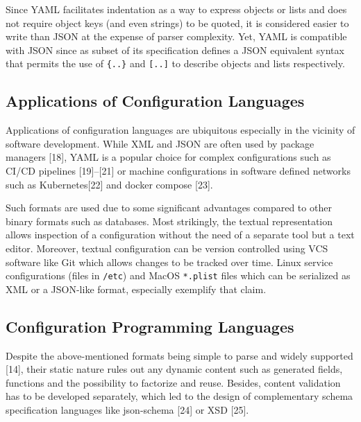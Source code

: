 \documentclass[
  a4paper,
  bibtex,
  english,
  nomenclature]{kthlatex/kththesis/kththesis}
\begin{document}
Since YAML facilitates indentation as a way to express objects or lists
and does not require object keys (and even strings) to be quoted, it is
considered easier to write than JSON at the expense of parser
complexity. Yet, YAML is compatible with JSON since as subset of its
specification defines a JSON equivalent syntax that permits the use of
\texttt{\{..\}} and \texttt{{[}..{]}} to describe objects and lists
respectively.

\hypertarget{sec:applications-of-configuration-languages}{%
\subsection{Applications of Configuration
Languages}\label{sec:applications-of-configuration-languages}}

Applications of configuration languages are ubiquitous especially in the
vicinity of software development. While XML and JSON are often used by
package managers {[}18{]}, YAML is a popular choice for complex
configurations such as CI/CD pipelines {[}19{]}--{[}21{]} or machine
configurations in software defined networks such as Kubernetes{[}22{]}
and docker compose {[}23{]}.

Such formats are used due to some significant advantages compared to
other binary formats such as databases. Most strikingly, the textual
representation allows inspection of a configuration without the need of
a separate tool but a text editor. Moreover, textual configuration can
be version controlled using VCS software like Git which allows changes
to be tracked over time. Linux service configurations (files in
\texttt{/etc}) and MacOS \texttt{*.plist} files which can be serialized
as XML or a JSON-like format, especially exemplify that claim.

\hypertarget{sec:configuration-programming-languages}{%
\subsection{Configuration Programming
Languages}\label{sec:configuration-programming-languages}}

Despite the above-mentioned formats being simple to parse and widely
supported {[}14{]}, their static nature rules out any dynamic content
such as generated fields, functions and the possibility to factorize and
reuse. Besides, content validation has to be developed separately, which
led to the design of complementary schema specification languages like
json-schema {[}24{]} or XSD {[}25{]}.
\end{document}
